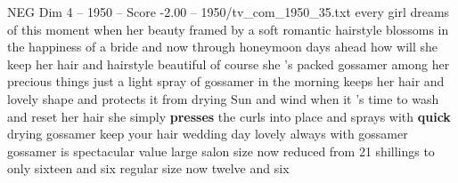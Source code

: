 \begin{textsample}{NEG Dim 4 – 1950 – Score -2.00 – 1950/tv\_com\_1950\_35.txt}  \label{ex:f4_neg_013}
every girl dreams of this moment when her beauty framed by a soft romantic hairstyle blossoms in the happiness of a bride and now through honeymoon days ahead how will she keep her hair and hairstyle beautiful of course she 's packed gossamer among her precious things just a light spray of gossamer in the morning keeps her hair and lovely shape and protects it from drying Sun and wind when it 's time to wash and reset her hair she simply \textbf{presses} the curls into place and sprays with \textbf{quick} drying gossamer keep your hair wedding day lovely always with gossamer gossamer is spectacular value large salon size now reduced from 21 shillings to only sixteen and six regular size now twelve and six

\end{textsample}
